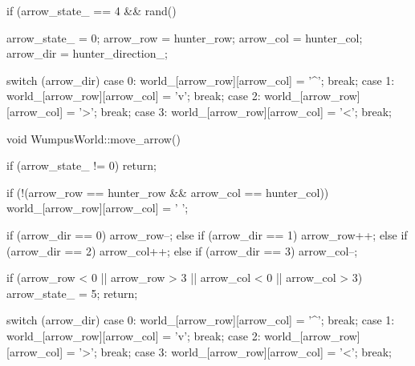 \begin{answercode}
{  if (arrow_state_ == 4 && rand() %
  {
    arrow_state_ = 0; 
    arrow_row = hunter_row;
    arrow_col = hunter_col;
    arrow_dir = hunter_direction_;

    switch (arrow_dir)
    {
      case 0: world_[arrow_row][arrow_col] = '^'; break;
      case 1: world_[arrow_row][arrow_col] = 'v'; break;
      case 2: world_[arrow_row][arrow_col] = '>'; break;
      case 3: world_[arrow_row][arrow_col] = '<'; break;
    }
  }
}

void WumpusWorld::move_arrow()
{
  if (arrow_state_ != 0) return;

  if (!(arrow_row == hunter_row && arrow_col == hunter_col))
  world_[arrow_row][arrow_col] = ' ';

  if (arrow_dir == 0) arrow_row--;
  else if (arrow_dir == 1) arrow_row++;
  else if (arrow_dir == 2) arrow_col++;
  else if (arrow_dir == 3) arrow_col--;

  if (arrow_row < 0 || arrow_row > 3 || arrow_col < 0 || arrow_col > 3)
  {
    arrow_state_ = 5;
    return;
  }

  switch (arrow_dir)
  {
    case 0: world_[arrow_row][arrow_col] = '^'; break;
    case 1: world_[arrow_row][arrow_col] = 'v'; break;
    case 2: world_[arrow_row][arrow_col] = '>'; break;
    case 3: world_[arrow_row][arrow_col] = '<'; break;
  }
}

\end{answercode}


